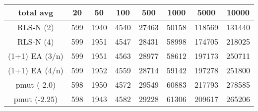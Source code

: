 \begin{tabular}[h]{cccccccc}
total avg&20&50&100&500&1000&5000&10000\\\hline
RLS-N (2)&599&1940&4540&27463&50158&118569&131440\\
RLS-N (4)&599&1951&4547&28431&58998&174705&218025\\
(1+1) EA (3/n)&599&1951&4563&28977&58612&197173&250711\\
(1+1) EA (4/n)&599&1952&4559&28714&59142&197278&251800\\
pmut (-2.0)&598&1950&4572&29549&60883&217793&278585\\
pmut (-2.25)&598&1943&4582&29228&61306&209617&265206\\
\end{tabular}

